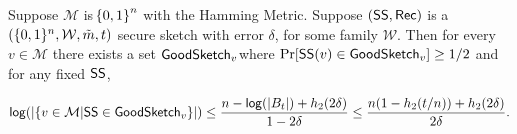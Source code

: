 \begin{lemma}
\label{lem:smallgeneralviable ss}
    Suppose $\mathcal{M}$ is $\!\left\{ 0,1 \right\}^{n}$ with the Hamming Metric. Suppose $({\mathsf{SS}}, {\mathsf{Rec}})$ is a $(\{0, 1\}^n, \mathcal{W}, \tilde{m}, t)$ secure sketch with error $\delta$, for some family $\mathcal{W}$. Then for every $v\in \mathcal{M}$ there exists a set $\mathsf{GoodSketch}_v$where $\Pr[{\mathsf{SS}}(v)\in \mathsf{GoodSketch}_v] \ge 1/2$ and for any fixed ${\mathsf{SS}}$,
    
    \[
    \mathsf{log}\!\left(|\{v \in \mathcal{M} | {\mathsf{SS}} \in \mathsf{GoodSketch}_v\}|\right) \le \frac{n - \mathsf{log}\!\left(|B_t|\right) +h_2(2\delta)}{1-2\delta} \le \frac{n(1-h_2(t/n)) +h_2(2\delta)}{2\delta}.
    \]
\end{lemma}



